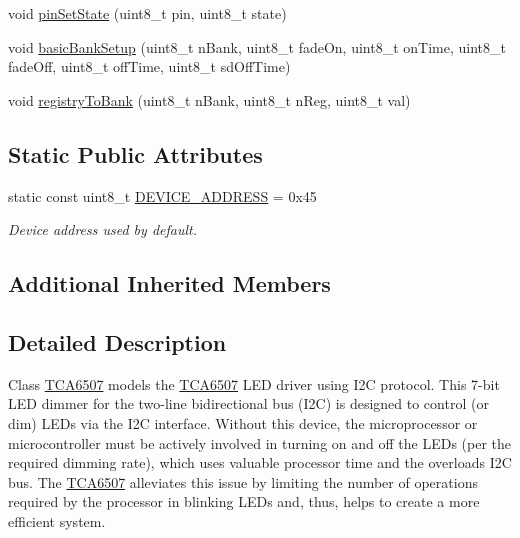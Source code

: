 \begin{DoxyCompactItemize}
\item 
void \hyperlink{classsmrtobj_1_1i2c_1_1_t_c_a6507_af4c4bd40c4b32067f8e189e27cf05ef7}{pin\+Set\+State} (uint8\+\_\+t pin, uint8\+\_\+t state)
\item 
void \hyperlink{classsmrtobj_1_1i2c_1_1_t_c_a6507_aa5bc0319b630246d0e8bd337b6c311ca}{basic\+Bank\+Setup} (uint8\+\_\+t n\+Bank, uint8\+\_\+t fade\+On, uint8\+\_\+t on\+Time, uint8\+\_\+t fade\+Off, uint8\+\_\+t off\+Time, uint8\+\_\+t sd\+Off\+Time)
\item 
void \hyperlink{classsmrtobj_1_1i2c_1_1_t_c_a6507_afba268a027f4792556f8fe57a424a1f1}{registry\+To\+Bank} (uint8\+\_\+t n\+Bank, uint8\+\_\+t n\+Reg, uint8\+\_\+t val)
\end{DoxyCompactItemize}
\subsection*{Static Public Attributes}
\begin{DoxyCompactItemize}
\item 
\hypertarget{classsmrtobj_1_1i2c_1_1_t_c_a6507_ad8c7f82e183bef0f41de9c5a373f9a97}{}static const uint8\+\_\+t \hyperlink{classsmrtobj_1_1i2c_1_1_t_c_a6507_ad8c7f82e183bef0f41de9c5a373f9a97}{D\+E\+V\+I\+C\+E\+\_\+\+A\+D\+D\+R\+E\+S\+S} = 0x45\label{classsmrtobj_1_1i2c_1_1_t_c_a6507_ad8c7f82e183bef0f41de9c5a373f9a97}

\begin{DoxyCompactList}\small\item\em Device address used by default. \end{DoxyCompactList}\end{DoxyCompactItemize}
\subsection*{Additional Inherited Members}


\subsection{Detailed Description}
Class \hyperlink{classsmrtobj_1_1i2c_1_1_t_c_a6507}{T\+C\+A6507} models the \hyperlink{classsmrtobj_1_1i2c_1_1_t_c_a6507}{T\+C\+A6507} L\+E\+D driver using I2\+C protocol. This 7-\/bit L\+E\+D dimmer for the two-\/line bidirectional bus (I2\+C) is designed to control (or dim) L\+E\+Ds via the I2\+C interface. Without this device, the microprocessor or microcontroller must be actively involved in turning on and off the L\+E\+Ds (per the required dimming rate), which uses valuable processor time and the overloads I2\+C bus. The \hyperlink{classsmrtobj_1_1i2c_1_1_t_c_a6507}{T\+C\+A6507} alleviates this issue by limiting the number of operations required by the processor in blinking L\+E\+Ds and, thus, helps to create a more efficient system. 

